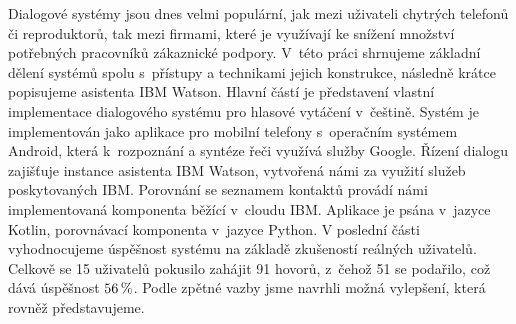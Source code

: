 \documentclass[12pt]{report}
\begin{document}

Dialogové systémy jsou dnes velmi populární, jak mezi uživateli chytrých
telefonů či reproduktorů, tak mezi firmami, které je využívají ke snížení
množství potřebných pracovníků zákaznické podpory. V~této práci
shrnujeme základní dělení systémů spolu s~přístupy a technikami
jejich konstrukce, následně krátce popisujeme asistenta IBM Watson.
Hlavní částí je představení vlastní implementace dialogového systému
pro hlasové vytáčení v~češtině. Systém je implementován jako aplikace
pro mobilní telefony s~operačním systémem Android, která k~rozpoznání
a syntéze řeči využívá služby Google. Řízení dialogu zajišťuje instance asistenta
IBM Watson, vytvořená námi za využití služeb poskytovaných IBM.
Porovnání se seznamem kontaktů provádí námi implementovaná komponenta běžící
v~cloudu IBM. Aplikace je psána v~jazyce Kotlin, porovnávací komponenta
v~jazyce Python. V poslední části vyhodnocujeme úspěšnost systému
na základě zkušeností reálných uživatelů. Celkově se 15 uživatelů pokusilo
zahájit 91 hovorů, z~čehož 51 se podařilo, což dává úspěšnost \(56\,\rm \%\).
Podle zpětné vazby jsme navrhli možná vylepšení, která rovněž představujeme.
\end{document}
